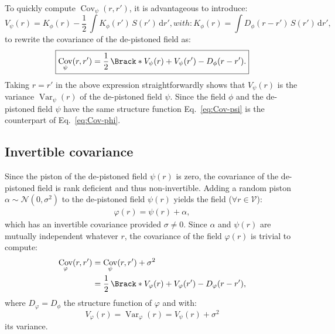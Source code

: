 \documentclass{article}
\DeclareMathOperator{\Var}{Var}
\DeclareMathOperator{\Cov}{Cov}
\begin{document}
To quickly compute $\Cov_{\psi}(r,r')$, it is advantageous to introduce:
\begin{subequations}
  \begin{equation}
    \label{eq:C-phi}
    V_{\psi}(r) = K_{\phi}(r)
    - \frac{1}{2}\,\int K_{\phi}(r')\,S(r')\,\mathrm{d}r',
  \end{equation}
  with:
  \begin{equation}
    \label{eq:K-phi}
    K_{\phi}(r) = \int D_{\phi}(r - r')\,S(r')\,\mathrm{d}r',
  \end{equation}
\end{subequations}
to rewrite the covariance of the de-pistoned field as:
\begin{equation}
  \boxed{
    \Cov_{\psi}(r,r')
    = \frac{1}{2}\,\Brack*{V_{\psi}(r) + V_{\psi}(r') - D_{\phi}(r - r')}.
  }
  \label{eq:Cov-psi}
\end{equation}
Taking $r = r'$ in the above expression straightforwardly shows that
$V_{\psi}(r)$ is the variance $\Var_{\psi}(r)$ of the de-pistoned field $\psi$.
Since the field $\phi$ and the de-pistoned field $\psi$ have the same structure
function Eq.~\eqref{eq:Cov-psi} is the counterpart of Eq.~\eqref{eq:Cov-phi}.


\subsection{Invertible covariance}

Since the piston of the de-pistoned field $\psi(r)$ is zero, the covariance of
the de-pistoned field is rank deficient and thus non-invertible. Adding a
random piston $\alpha \sim \mathcal{N}(0,\sigma^{2})$ to the de-pistoned field
$\psi(r)$ yields the field ($\forall r \in \mathcal{V}$):
\begin{align}
  \label{eq:varphi-def}
  \varphi(r) = \psi(r) + \alpha,
\end{align}
which has an invertible covariance provided $\sigma \not= 0$. Since $\alpha$
and $\psi(r)$ are mutually independent whatever $r$, the covariance of the
field $\varphi(r)$ is trivial to compute:
\begin{align}
  \Cov_{\varphi}(r,r')
  &= \Cov_{\psi}(r,r') + \sigma^{2} \notag\\
  &= \frac{1}{2}\,\Brack*{V_{\varphi}(r) + V_{\varphi}(r') - D_{\varphi}(r - r')},
  \label{eq:Cov-varphi}
\end{align}
where $D_{\varphi} = D_{\phi}$ the structure function of $\varphi$ and with:
\begin{equation}
  \label{eq:Var-varphi}
  V_{\varphi}(r) = \Var_{\varphi}(r) = V_{\psi}(r) + \sigma^{2}
\end{equation}
its variance.
\end{document}
